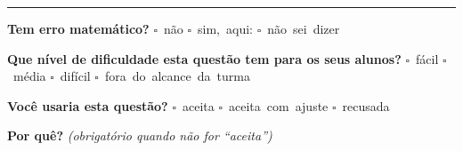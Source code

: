 \documentclass[11pt,a4paper]{article}
\begin{document}
\noindent\rule{\linewidth}{0.4pt}
\textbf{Tem erro matemático?}\quad
\mbox{$\square$~não} \quad \mbox{$\square$~sim, aqui:} \underline{\hspace{5cm}}
\quad \mbox{$\square$~não sei dizer}

\textbf{Que nível de dificuldade esta questão tem para os seus alunos?}\quad
\mbox{$\square$~fácil} \quad \mbox{$\square$~média} \quad
\mbox{$\square$~difícil} \quad \mbox{$\square$~fora do alcance da turma}

\textbf{Você usaria esta questão?}\quad
\mbox{$\square$~aceita} \quad \mbox{$\square$~aceita com ajuste} \quad
\mbox{$\square$~recusada}

\textbf{Por quê?} \emph{(obrigatório quando não for ``aceita'')}

\underline{\hspace{\linewidth}}

\underline{\hspace{\linewidth}}
\vspace{0.6em}
\end{document}
